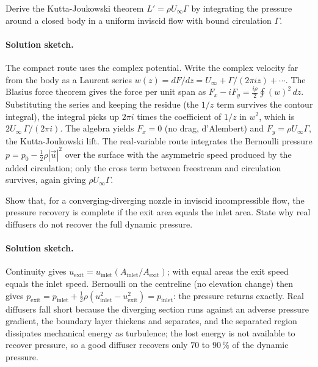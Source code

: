 \begin{exercise}
Derive the Kutta-Joukowski theorem $L' = \rho U_\infty \Gamma$ by
integrating the pressure around a closed body in a uniform inviscid
flow with bound circulation $\Gamma$.

\paragraph{Solution sketch.} The compact route uses the complex
potential. Write the complex velocity far from the body as a Laurent
series $w(z) = dF/dz = U_\infty + \Gamma/(2\pi i z) + \cdots$. The
Blasius force theorem gives the force per unit span as $F_x - iF_y =
\tfrac{i\rho}{2}\oint (w)^2\,dz$. Substituting the series and keeping
the residue (the $1/z$ term survives the contour integral), the
integral picks up $2\pi i$ times the coefficient of $1/z$ in $w^2$,
which is $2U_\infty\,\Gamma/(2\pi i)$. The algebra yields $F_x = 0$
(no drag, d'Alembert) and $F_y = \rho U_\infty\Gamma$, the
Kutta-Joukowski lift. The real-variable route integrates the
Bernoulli pressure $p = p_0 - \tfrac12\rho|\vec{u}|^2$ over the
surface with the asymmetric speed produced by the added circulation;
only the cross term between freestream and circulation survives, again
giving $\rho U_\infty\Gamma$.
\end{exercise}

\begin{exercise}
Show that, for a converging-diverging nozzle in inviscid
incompressible flow, the pressure recovery is complete if the exit
area equals the inlet area. State why real diffusers do not
recover the full dynamic pressure.

\paragraph{Solution sketch.} Continuity gives $u_\text{exit} =
u_\text{inlet}(A_\text{inlet}/A_\text{exit})$; with equal areas the
exit speed equals the inlet speed. Bernoulli on the centreline (no
elevation change) then gives $p_\text{exit} = p_\text{inlet} +
\tfrac12\rho(u_\text{inlet}^2 - u_\text{exit}^2) = p_\text{inlet}$:
the pressure returns exactly. Real diffusers fall short because the
diverging section runs against an adverse pressure gradient, the
boundary layer thickens and separates, and the separated region
dissipates mechanical energy as turbulence; the lost energy is not
available to recover pressure, so a good diffuser recovers only
$70$ to $90\,\%$ of the dynamic pressure.
\end{exercise}

